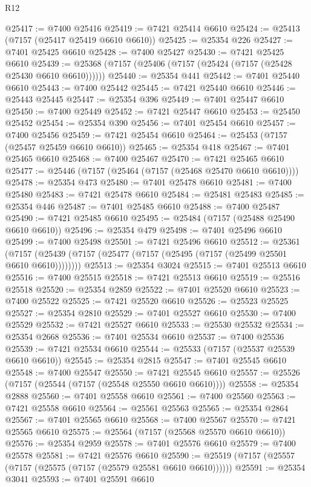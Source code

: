 \begin{lexlean}{R12}
\begin{coremodule}
{{{{{{{{{{{{{{{{{{{{{{{{{{{{{{{{{{{{{{{{{{{{{{{{{{{{{{{{{{{{{{{{{{{{{{{{{{{{{{{{{{@25417 := @7400 @25416
@25419 := @7421 @25414 @6610
@25424 := @25413 (@7157 (@25417 @25419 @6610 @6610))
@25425 := @25354 @226
@25427 := @7401 @25425 @6610
@25428 := @7400 @25427
@25430 := @7421 @25425 @6610
@25439 := @25368 (@7157 (@25406 (@7157 (@25424 (@7157 (@25428 @25430 @6610 @6610))))))
@25440 := @25354 @441
@25442 := @7401 @25440 @6610
@25443 := @7400 @25442
@25445 := @7421 @25440 @6610
@25446 := @25443 @25445
@25447 := @25354 @396
@25449 := @7401 @25447 @6610
@25450 := @7400 @25449
@25452 := @7421 @25447 @6610
@25453 := @25450 @25452
@25454 := @25354 @390
@25456 := @7401 @25454 @6610
@25457 := @7400 @25456
@25459 := @7421 @25454 @6610
@25464 := @25453 (@7157 (@25457 @25459 @6610 @6610))
@25465 := @25354 @418
@25467 := @7401 @25465 @6610
@25468 := @7400 @25467
@25470 := @7421 @25465 @6610
@25477 := @25446 (@7157 (@25464 (@7157 (@25468 @25470 @6610 @6610))))
@25478 := @25354 @473
@25480 := @7401 @25478 @6610
@25481 := @7400 @25480
@25483 := @7421 @25478 @6610
@25484 := @25481 @25483
@25485 := @25354 @446
@25487 := @7401 @25485 @6610
@25488 := @7400 @25487
@25490 := @7421 @25485 @6610
@25495 := @25484 (@7157 (@25488 @25490 @6610 @6610))
@25496 := @25354 @479
@25498 := @7401 @25496 @6610
@25499 := @7400 @25498
@25501 := @7421 @25496 @6610
@25512 := @25361
    (@7157 (@25439 (@7157 (@25477 (@7157 (@25495 (@7157 (@25499 @25501 @6610 @6610))))))))
@25513 := @25354 @3024
@25515 := @7401 @25513 @6610
@25516 := @7400 @25515
@25518 := @7421 @25513 @6610
@25519 := @25516 @25518
@25520 := @25354 @2859
@25522 := @7401 @25520 @6610
@25523 := @7400 @25522
@25525 := @7421 @25520 @6610
@25526 := @25523 @25525
@25527 := @25354 @2810
@25529 := @7401 @25527 @6610
@25530 := @7400 @25529
@25532 := @7421 @25527 @6610
@25533 := @25530 @25532
@25534 := @25354 @2668
@25536 := @7401 @25534 @6610
@25537 := @7400 @25536
@25539 := @7421 @25534 @6610
@25544 := @25533 (@7157 (@25537 @25539 @6610 @6610))
@25545 := @25354 @2815
@25547 := @7401 @25545 @6610
@25548 := @7400 @25547
@25550 := @7421 @25545 @6610
@25557 := @25526 (@7157 (@25544 (@7157 (@25548 @25550 @6610 @6610))))
@25558 := @25354 @2888
@25560 := @7401 @25558 @6610
@25561 := @7400 @25560
@25563 := @7421 @25558 @6610
@25564 := @25561 @25563
@25565 := @25354 @2864
@25567 := @7401 @25565 @6610
@25568 := @7400 @25567
@25570 := @7421 @25565 @6610
@25575 := @25564 (@7157 (@25568 @25570 @6610 @6610))
@25576 := @25354 @2959
@25578 := @7401 @25576 @6610
@25579 := @7400 @25578
@25581 := @7421 @25576 @6610
@25590 := @25519 (@7157 (@25557 (@7157 (@25575 (@7157 (@25579 @25581 @6610 @6610))))))
@25591 := @25354 @3041
@25593 := @7401 @25591 @6610
}}}}}}}}}}}}}}}}}}}}}}}}}}}}}}}}}}}}}}}}}}}}}}}}}}}}}}}}}}}}}}}}}}}}}}}}}}}}}}}}}}
\end{coremodule}
\end{lexlean}
